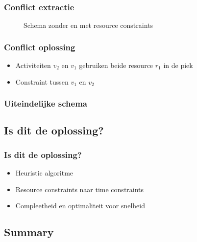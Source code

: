\documentclass{beamer}
\theoremstyle{definition}
\newcommand{\inputtikz}[1]{}
\begin{document}
\begin{frame}
	\frametitle{Conflict extractie}
	\vspace{-1.2em}
	\begin{figure}[ht]
		\makebox[\textwidth][c]{\resizebox{.36\paperwidth}{!}{
			\inputtikz{schedule_infeasible_colored_profile_2}
		}}
		\vspace{-1.3em}
		\caption{Schema zonder en met resource constraints}
	\end{figure}
\end{frame}

\begin{frame}
	\frametitle{Conflict oplossing}
	\begin{itemize}
		\item Activiteiten $v_2$ en $v_1$ gebruiken beide resource $r_1$ in de piek
		\item Constraint tussen $v_1$ en $v_2$
	\end{itemize}
\end{frame}

\begin{frame}
	\frametitle{Uiteindelijke schema}
	\vspace{-0.2em}
	\begin{figure}[ht]
		\makebox[\textwidth][c]{\resizebox{.38\paperwidth}{!}{
			\inputtikz{schedule_feasible_profile}
		}}
		\label{fig:activity_graph}
	\end{figure}
\end{frame}

\subsection{Is dit de oplossing?}
\begin{frame}
	\frametitle{Is dit de oplossing?}
	\begin{itemize}
		\item Heuristic algoritme
		\item<2-> Resource constraints naar time constraints
		\item<3-> Compleetheid en optimaliteit voor snelheid
	\end{itemize}
\end{frame}
	

\subsection{Summary}
\end{document}
